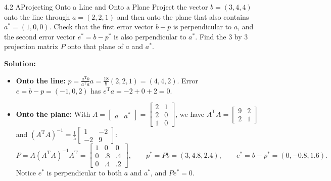 \documentclass[11pt,a4paper,openany,oneside]{book}
\def\vect#1{#1}%
\def\mathbf#1{#1}%
\newcommand{\vect}[1]{\mathbf{#1}}
\newcommand{\T}{\mathrm{T}}
\numberwithin{equation}{chapter}
\begin{document}
\begin{example}{4.2 A}{Projecting Onto a Line and Onto a Plane}
Project the vector $\vect{b} = (3, 4, 4)$ onto the line through $\vect{a} = (2, 2, 1)$ and then onto the plane that also contains $\vect{a}^* = (1, 0, 0)$. Check that the first error vector $\vect{b} - \vect{p}$ is perpendicular to $\vect{a}$, and the second error vector $\vect{e}^* = \vect{b} - \vect{p}^*$ is also perpendicular to $\vect{a}^*$. Find the $3$ by $3$ projection matrix $P$ onto that plane of $\vect{a}$ and $\vect{a}^*$.
\end{example}
\textbf{Solution:}
\begin{itemize}
\item \textbf{Onto the line:} $\vect{p} = \frac{\vect{a}^\T\vect{b}}{\vect{a}^\T\vect{a}}\vect{a} = \frac{18}{9}(2,2,1) = (4,4,2)$. Error $\vect{e} = \vect{b}-\vect{p} = (-1,0,2)$ has $\vect{e}^\T\vect{a} = -2+0+2 = 0$.
\item \textbf{Onto the plane:} With $A = \begin{bmatrix}\vect{a} & \vect{a}^*\end{bmatrix} = \begin{bmatrix}2&1\\2&0\\1&0\end{bmatrix}$, we have $A^\T A = \begin{bmatrix}9&2\\2&1\end{bmatrix}$ and $(A^\T A)^{-1} = \frac{1}{5}\begin{bmatrix}1&-2\\-2&9\end{bmatrix}$:
\[
P = A(A^\T A)^{-1}A^\T = \begin{bmatrix} 1 & 0 & 0 \\ 0 & .8 & .4 \\ 0 & .4 & .2 \end{bmatrix}, \qquad \vect{p}^* = P\vect{b} = (3, 4.8, 2.4), \qquad \vect{e}^* = \vect{b} - \vect{p}^* = (0, -0.8, 1.6).
\]
Notice $\vect{e}^*$ is perpendicular to both $\vect{a}$ and $\vect{a}^*$, and $P\vect{e}^* = \vect{0}$.
\end{itemize}
\end{document}
